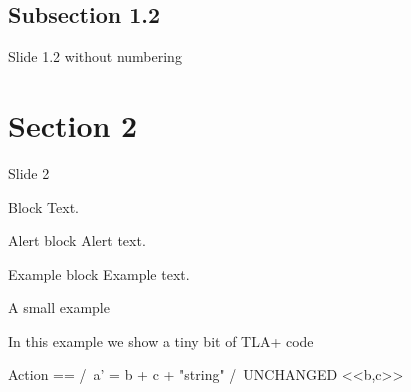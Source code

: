\documentclass{beamer}
\begin{document}
    \subsection{Subsection 1.2}
    \begin{frame}[nonumber]{Slide 1.2 without numbering}
        \lipsum[2]
    \end{frame}

    \section{Section 2}
    \begin{frame}{Slide 2}
        \begin{block}{Block}
            Text.
        \end{block}
        \pause
        \begin{alertblock}{Alert block}
            Alert \alert{text}.
        \end{alertblock}
        \pause
        \begin{exampleblock}{Example block}
            Example \textcolor{greenPolimi}{text}.
        \end{exampleblock}
    \end{frame}

    \begin{frame}[fragile]{A small example}
        \begin{minipage}{\textwidth}
            In this example we show a tiny bit of TLA+ code
            \begin{tla}
                Action == /\ a' = b + c + "string"
                          /\ UNCHANGED <<b,c>>
            \end{tla}
            \begin{tlatex}
            \end{tlatex}
        \end{minipage}
    \end{frame}

    

    

    
\end{document}
